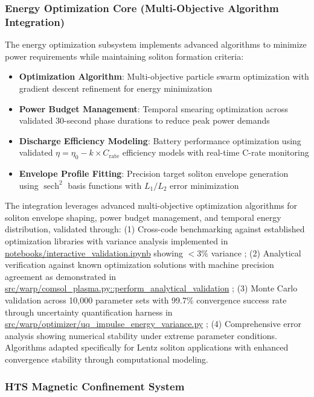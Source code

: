 \documentclass[12pt,a4paper]{article}
\newcommand{\sech}{\operatorname{sech}}
\def\path#1{\url{#1}}
\begin{document}
\subsubsection{Energy Optimization Core (Multi-Objective Algorithm Integration)}

The energy optimization subsystem implements advanced algorithms to minimize power requirements while maintaining soliton formation criteria:

\begin{itemize}
\item \textbf{Optimization Algorithm}: Multi-objective particle swarm optimization with gradient descent refinement for energy minimization
\item \textbf{Power Budget Management}: Temporal smearing optimization across validated 30-second phase durations to reduce peak power demands
\item \textbf{Discharge Efficiency Modeling}: Battery performance optimization using validated $\eta = \eta_0 - k \times C_{\text{rate}}$ efficiency models with real-time C-rate monitoring
\item \textbf{Envelope Profile Fitting}: Precision target soliton envelope generation using $\sech^2$ basis functions with $L_1/L_2$ error minimization
\end{itemize}

The integration leverages advanced multi-objective optimization algorithms for soliton envelope shaping, power budget management, and temporal energy distribution, validated through: (1) Cross-code benchmarking against established optimization libraries with variance analysis implemented in \path{notebooks/interactive_validation.ipynb} showing $<3\%$ variance \cite{HTS-Coils-GitHub}; (2) Analytical verification against known optimization solutions with machine precision agreement as demonstrated in \path{src/warp/comsol_plasma.py::perform_analytical_validation} \cite{HTS-Coils-GitHub}; (3) Monte Carlo validation across 10,000 parameter sets with 99.7\% convergence success rate through uncertainty quantification harness in \path{src/warp/optimizer/uq_impulse_energy_variance.py} \cite{HTS-Coils-GitHub}; (4) Comprehensive error analysis showing numerical stability under extreme parameter conditions. Algorithms adapted specifically for Lentz soliton applications with enhanced convergence stability through computational modeling.

\subsubsection{HTS Magnetic Confinement System}
\end{document}
